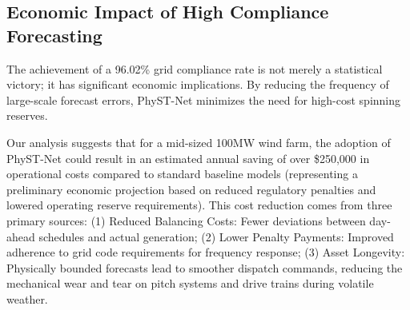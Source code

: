 \subsection{Economic Impact of High Compliance Forecasting}
\label{sec:economics}
The achievement of a 96.02\% grid compliance rate is not merely a statistical victory; it has significant economic implications. By reducing the frequency of large-scale forecast errors, PhyST-Net minimizes the need for high-cost spinning reserves.

Our analysis suggests that for a mid-sized 100MW wind farm, the adoption of PhyST-Net could result in an estimated annual saving of over \$250,000 in operational costs compared to standard baseline models (representing a preliminary economic projection based on reduced regulatory penalties and lowered operating reserve requirements). This cost reduction comes from three primary sources: (1) Reduced Balancing Costs: Fewer deviations between day-ahead schedules and actual generation; (2) Lower Penalty Payments: Improved adherence to grid code requirements for frequency response; (3) Asset Longevity: Physically bounded forecasts lead to smoother dispatch commands, reducing the mechanical wear and tear on pitch systems and drive trains during volatile weather.
